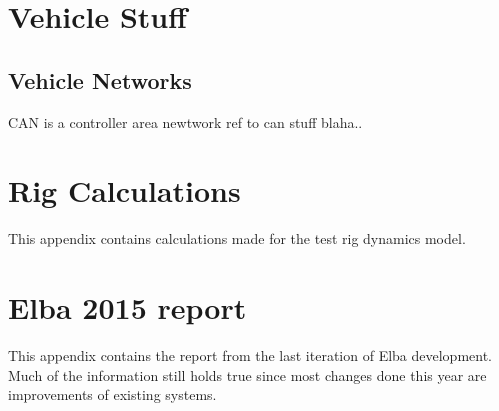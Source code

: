 \chapter{Vehicle Stuff} \label{appA}

\section{Vehicle Networks}
CAN is a controller area newtwork ref to can stuff blaha..

\chapter{Rig Calculations} \label{app:rigdata}
This appendix contains calculations made for the test rig dynamics model. 

\chapter{Elba 2015 report} \label{app:elba2015}
This appendix contains the report from the last iteration of Elba development.
Much of the information still holds true since most changes done this year are
improvements of existing systems.

